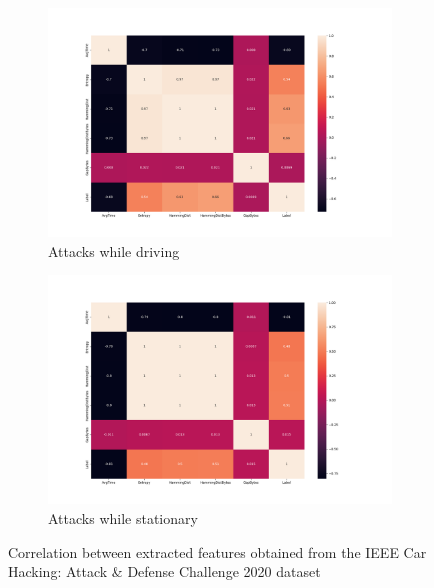 \begin{figure}
    \centering
    
    \begin{subfigure}[b]{.6\linewidth}
        \centering
        \includegraphics[width = \linewidth]{img/parts/app/feature_correlation/ieee_challenge/pre_submit_D.png}
        \caption{Attacks while driving}
        \label{subfig:apdx_fe_ieee_d}
    \end{subfigure}
    
    \begin{subfigure}[b]{.6\linewidth}
        \centering
        \includegraphics[width = \linewidth]{img/parts/app/feature_correlation/ieee_challenge/pre_submit_S.png}
        \caption{Attacks while stationary}
        \label{subfig:apdx_fe_ieee_s}
    \end{subfigure}
    
    \caption{Correlation between extracted features obtained from the IEEE Car Hacking: Attack \& Defense Challenge 2020 dataset}
    \label{fig:apdx_fe_ieee}
\end{figure}

